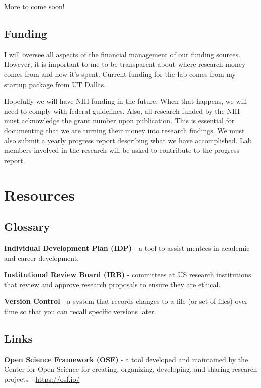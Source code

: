 \documentclass[]{book}
\begin{document}
More to come soon!

\hypertarget{funding}{%
\section{Funding}\label{funding}}

I will oversee all aspects of the financial management of our funding sources. However, it is important to me to be transparent about where research money comes from and how it's spent. Current funding for the lab comes from my startup package from UT Dallas.

Hopefully we will have NIH funding in the future. When that happens, we will need to comply with federal guidelines. Also, all research funded by the NIH must acknowledge the grant number upon publication. This is essential for documenting that we are turning their money into research findings. We must also submit a yearly progress report describing what we have accomplished. Lab members involved in the research will be asked to contribute to the progress report.

\hypertarget{resources}{%
\chapter{Resources}\label{resources}}

\hypertarget{glossary}{%
\section{Glossary}\label{glossary}}

\textbf{Individual Development Plan (IDP)} - a tool to assist mentees in academic and career development.

\textbf{Institutional Review Board (IRB)} - committees at US research institutions that review and approve research proposals to ensure they are ethical.

\textbf{Version Control} - a system that records changes to a file (or set of files) over time so that you can recall specific versions later.

\hypertarget{links}{%
\section{Links}\label{links}}

\textbf{Open Science Framework (OSF)} - a tool developed and maintained by the Center for Open Science for creating, organizing, developing, and sharing research projects - \url{https://osf.io/}
\end{document}
